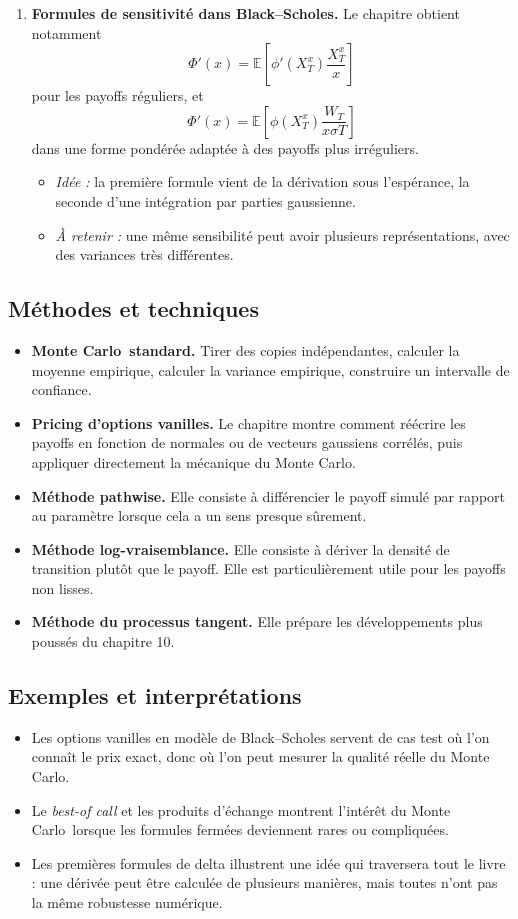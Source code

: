 \documentclass[11pt,a4paper]{article}
\newcommand{\E}{\mathbb{E}}
\newcommand{\mc}{Monte Carlo}
\begin{document}
\begin{enumerate}[label=\textbf{\arabic*.}]
  \item \textbf{Formules de sensitivité dans Black--Scholes.} Le chapitre obtient notamment
  \[
    \Phi'(x)=\E\!\left[\phi'(X_T^x)\frac{X_T^x}{x}\right]
  \]
  pour les payoffs réguliers, et
  \[
    \Phi'(x)=\E\!\left[\phi(X_T^x)\frac{W_T}{x\sigma T}\right]
  \]
  dans une forme pondérée adaptée à des payoffs plus irréguliers.
  \begin{itemize}
    \item \emph{Idée :} la première formule vient de la dérivation sous l'espérance, la seconde d'une intégration par parties gaussienne.
    \item \emph{À retenir :} une même sensibilité peut avoir plusieurs représentations, avec des variances très différentes.
  \end{itemize}
\end{enumerate}

\subsection{Méthodes et techniques}

\begin{itemize}
  \item \textbf{\mc\ standard.} Tirer des copies indépendantes, calculer la moyenne empirique, calculer la variance empirique, construire un intervalle de confiance.
  \item \textbf{Pricing d'options vanilles.} Le chapitre montre comment réécrire les payoffs en fonction de normales ou de vecteurs gaussiens corrélés, puis appliquer directement la mécanique du \mc.
  \item \textbf{Méthode pathwise.} Elle consiste à différencier le payoff simulé par rapport au paramètre lorsque cela a un sens presque sûrement.
  \item \textbf{Méthode log-vraisemblance.} Elle consiste à dériver la densité de transition plutôt que le payoff. Elle est particulièrement utile pour les payoffs non lisses.
  \item \textbf{Méthode du processus tangent.} Elle prépare les développements plus poussés du chapitre 10.
\end{itemize}

\subsection{Exemples et interprétations}

\begin{itemize}
  \item Les options vanilles en modèle de Black--Scholes servent de cas test où l'on connaît le prix exact, donc où l'on peut mesurer la qualité réelle du \mc.
  \item Le \emph{best-of call} et les produits d'échange montrent l'intérêt du \mc\ lorsque les formules fermées deviennent rares ou compliquées.
  \item Les premières formules de delta illustrent une idée qui traversera tout le livre : une dérivée peut être calculée de plusieurs manières, mais toutes n'ont pas la même robustesse numérique.
\end{itemize}
\end{document}

